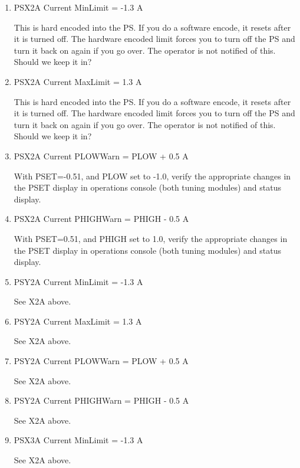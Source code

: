\documentclass[11pt]{book}		%
\begin{document}
\begin{enumerate}
 \item PSX2A Current MinLimit = -1.3 A

\color{red}
This is hard encoded into the PS. If you do a software encode, it resets after it is turned off. The hardware encoded limit forces you to turn off the PS and turn it back on again if you go over. The operator is not notified of this. Should we keep it in?
\color{black}

 \item PSX2A Current MaxLimit = 1.3 A

\color{red}
This is hard encoded into the PS. If you do a software encode, it resets after it is turned off. The hardware encoded limit forces you to turn off the PS and turn it back on again if you go over. The operator is not notified of this. Should we keep it in?
\color{black}

 \item PSX2A Current PLOWWarn = PLOW + 0.5 A

\color{red}
With PSET=-0.51, and PLOW set to -1.0, verify the appropriate changes in the PSET display in operations console (both tuning modules) and status display.
\color{black}

 \item PSX2A Current PHIGHWarn = PHIGH - 0.5 A

\color{red}
With PSET=0.51, and PHIGH set to 1.0, verify the appropriate changes in the PSET display in operations console (both tuning modules) and status display.
\color{black}

 \item PSY2A Current MinLimit = -1.3 A

\color{red}
See X2A above.
\color{black}

 \item PSY2A Current MaxLimit = 1.3 A

\color{red}
See X2A above.
\color{black}

 \item PSY2A Current PLOWWarn = PLOW + 0.5 A

\color{red}
See X2A above.
\color{black}

 \item PSY2A Current PHIGHWarn = PHIGH - 0.5 A

\color{red}
See X2A above.
\color{black}

 \item PSX3A Current MinLimit = -1.3 A

\color{red}
See X2A above.
\color{black}


\end{enumerate}
\end{document}

